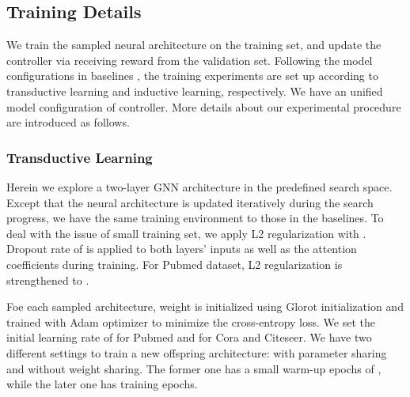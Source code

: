 \documentclass[sigconf]{acmart}
\begin{document}
\subsection{Training Details}
We train the sampled neural architecture on the training set, and update the controller via receiving reward from the validation set. Following the model configurations in baselines \cite{velickovic2017graph, gao2018large}, the training experiments are set up according to transductive learning and inductive learning, respectively. We have an unified model configuration of controller. More details about our experimental procedure are introduced as follows. 

\subsubsection{\textbf{Transductive Learning}}
Herein we explore a two-layer GNN architecture in the predefined search space. Except that the neural architecture is updated iteratively during the search progress, we have the same training environment to those in the baselines. To deal with the issue of small training set, we apply L2 regularization with . Dropout rate of  is applied to both layers’ inputs as well as the attention coefficients during training. For Pubmed dataset, L2 regularization is strengthened to . 

Foe each sampled architecture, weight is initialized using Glorot initialization \cite{glorot2010understanding} and trained with Adam optimizer \cite{kingma2014adam} to minimize the cross-entropy loss. We set the initial learning rate of  for Pubmed and  for Cora and Citeseer. We have two different settings to train a new offspring architecture: with parameter sharing and without weight sharing. The former one has a small warm-up epochs of , while the later one has  training epochs.
\end{document}
